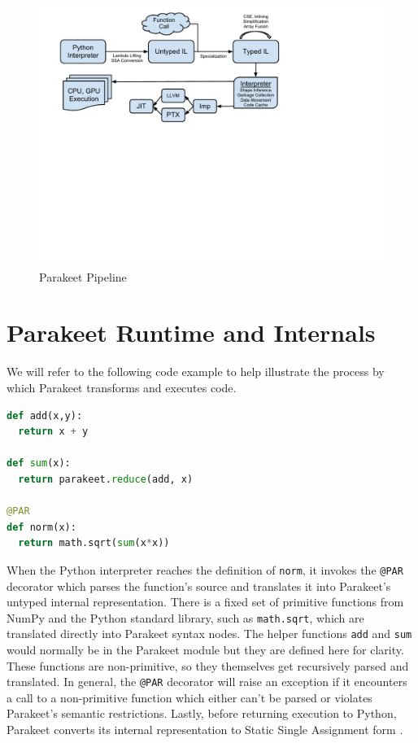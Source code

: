 \documentclass[10pt,twocolumn]{article}
\begin{document}
\begin{figure}[t!bh]
\begin{center}
\leavevmode
\includegraphics[scale=0.6, trim=0pt 310pt 140pt 80pt]{ParakeetNumPyOverview.pdf}
\end{center}
\caption{Parakeet Pipeline}
\label{fig:overview}
\end{figure}

\section{Parakeet Runtime and Internals}
We will refer to the following code example to help illustrate the process by which Parakeet transforms and executes code. 
\begin{lstlisting}[language=Python,frame=single, label=Norm, caption={Vector Norm in Parakeet},  belowskip=0.5em]
def add(x,y):
  return x + y

def sum(x):
  return parakeet.reduce(add, x)

@PAR
def norm(x):
  return math.sqrt(sum(x*x))
\end{lstlisting}

When the Python interpreter reaches the definition of \lstinline{norm}, it invokes the \lstinline{@PAR} decorator which parses the function's source and translates it into Parakeet's untyped internal representation. There is a fixed set of primitive functions from NumPy and the Python standard library, such as \lstinline{math.sqrt}, which are translated directly into Parakeet syntax nodes. The helper functions \lstinline{add} and \lstinline{sum} would normally be in the Parakeet module but they are defined here for clarity. These functions are non-primitive, so they themselves get recursively parsed and translated.  In general, the \lstinline{@PAR} decorator will raise an exception if it encounters a call to a non-primitive function which either can't be parsed or violates Parakeet's semantic restrictions. Lastly, before returning execution to Python, Parakeet converts its internal representation to Static Single Assignment form \cite{Cytr91}. 
\end{document}

